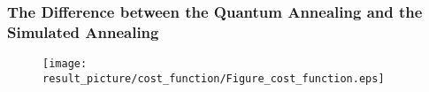 \documentclass{beamer}
\begin{document}
\begin{frame}
	\frametitle{The Difference between the Quantum Annealing and the Simulated Annealing}
	\begin{figure}[h]
		\centering
		\texttt{[image: result\_picture/cost\_function/Figure\_cost\_function.eps]}
	\end{figure}
\end{frame}
\end{document}
